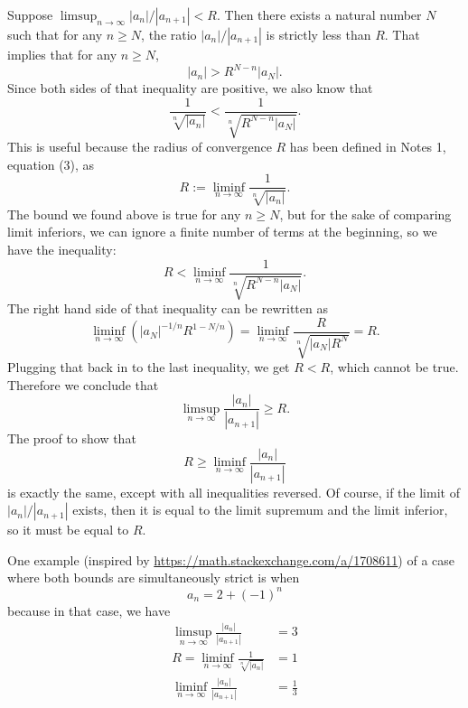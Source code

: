 \documentclass[12pt]{article}
\begin{document}
\noindent{}\bigskip

Suppose $\limsup_{n \rightarrow \infty} |a_n|/|a_{n+1}| < R$. Then there exists a natural number $N$ such that for any $n \geq N$, the ratio $|a_n|/|a_{n+1}|$ is strictly less than $R$. That implies that for any $n \geq N$,
\[ |a_n| > R^{N-n}|a_N|. \]
Since both sides of that inequality are positive, we also know that
\[ \frac{1}{\sqrt[n]{|a_n|}} < \frac{1}{\sqrt[n]{R^{N-n}|a_N|}}. \]
This is useful because the radius of convergence $R$ has been defined in Notes 1, equation (3), as
\[ R := \liminf_{n \rightarrow \infty} \frac{1}{\sqrt[n]{|a_n|}}. \]
The bound we found above is true for any $n \geq N$, but for the sake of comparing limit inferiors, we can ignore a finite number of terms at the beginning, so we have the inequality:
\[ R < \liminf_{n \rightarrow \infty} \frac{1}{\sqrt[n]{R^{N-n}|a_N|}}. \]
The right hand side of that inequality can be rewritten as
\[ \liminf_{n \rightarrow \infty} \left( |a_N|^{-1/n} R^{1-N/n} \right) = \liminf_{n \rightarrow \infty} \frac{R}{\sqrt[n]{|a_N|R^N}} = R. \]
Plugging that back in to the last inequality, we get $R<R$, which cannot be true. Therefore we conclude that
\[ \limsup_{n \rightarrow \infty} \frac{|a_n|}{|a_{n+1}|} \geq R. \]
The proof to show that
\[ R \geq \liminf_{n \rightarrow \infty} \frac{|a_n|}{|a_{n+1}|} \]
is exactly the same, except with all inequalities reversed. Of course, if the limit of $|a_n|/|a_{n+1}|$ exists, then it is equal to the limit supremum and the limit inferior, so it must be equal to $R$.
\par
One example (inspired by \url{https://math.stackexchange.com/a/1708611}) of a case where both bounds are simultaneously strict is when
\[ a_n = 2 + (-1)^n \]
because in that case, we have
\begin{align*}
    \limsup_{n \rightarrow \infty} \frac{|a_n|}{|a_{n+1}|} &= 3 \\
    R = \liminf_{n \rightarrow \infty} \frac{1}{\sqrt[n]{|a_n|}} &= 1 \\
    \liminf_{n \rightarrow \infty} \frac{|a_n|}{|a_{n+1}|} &= \frac{1}{3} \\
\end{align*}
\end{document}
